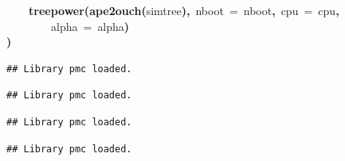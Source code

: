 \documentclass{elsarticle}
\makeatletter
\newcommand{\hlfunctioncall}[1]{\textcolor[rgb]{.5,0,.33}{\textbf{#1}}}%
\newcommand{\hlkeyword}[1]{\textbf{#1}}%
\newcommand{\hlargument}[1]{\textcolor[rgb]{.69,.25,.02}{#1}}%
\newcommand{\hlsymbol}[1]{#1}%
\newcommand{\hlstd}[1]{\textcolor[rgb]{0,0,0}{#1}}%
\newenvironment{kframe}{%
 \def\FrameCommand##1{\hskip\@totalleftmargin \hskip-\fboxsep
 \colorbox{shadecolor}{##1}\hskip-\fboxsep
     \hskip-\linewidth \hskip-\@totalleftmargin \hskip\columnwidth}%
 \MakeFramed {\advance\hsize-\width
   \@totalleftmargin\z@ \linewidth\hsize
   \@setminipage}}%
 {\par\unskip\endMakeFramed}
\newenvironment{knitrout}{}{} %
\makeatother
\begin{document}
\begin{knitrout}
\begin{kframe}
\begin{flushleft}
\hlstd{}{\ }{\ }{\ }{\ }\hlfunctioncall{treepower}\hlkeyword{(}\hlfunctioncall{ape2ouch}\hlkeyword{(}\hlsymbol{simtree}\hlkeyword{)}\hlkeyword{,}{\ }\hlargument{nboot}{\ }\hlargument{=}{\ }\hlsymbol{nboot}\hlkeyword{,}{\ }\hlargument{cpu}{\ }\hlargument{=}{\ }\hlsymbol{cpu}\hlkeyword{,}\hspace*{\fill}\\
\hlstd{}{\ }{\ }{\ }{\ }{\ }{\ }{\ }{\ }\hlargument{alpha}{\ }\hlargument{=}{\ }\hlsymbol{alpha}\hlkeyword{)}\hspace*{\fill}\\
\hlstd{}\hlkeyword{\usebox{\hlnormalsizeboxclosebrace}}\hlkeyword{)}\mbox{}
\normalfont
\end{flushleft}
\begin{verbatim}
## Library pmc loaded.
\end{verbatim}
\begin{verbatim}
## Library pmc loaded.
\end{verbatim}
\begin{verbatim}
## Library pmc loaded.
\end{verbatim}
\begin{verbatim}
## Library pmc loaded.
\end{verbatim}
\end{kframe}
\end{knitrout}
\end{document}
